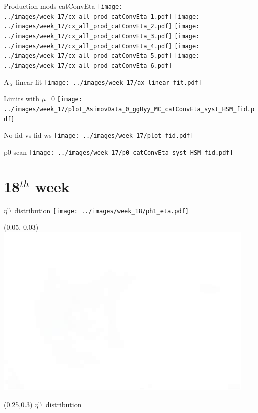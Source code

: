 \documentclass[10pt,UKenglish, leqno, xcolor = dvipsnames]{beamer}
\begin{document}
		\begin{frame}{Production mods catConvEta}
			\vfill
			\centering
			\texttt{[image: ../images/week\_17/cx\_all\_prod\_catConvEta\_1.pdf]}
			\texttt{[image: ../images/week\_17/cx\_all\_prod\_catConvEta\_2.pdf]}
			\texttt{[image: ../images/week\_17/cx\_all\_prod\_catConvEta\_3.pdf]}
			\texttt{[image: ../images/week\_17/cx\_all\_prod\_catConvEta\_4.pdf]}
			\texttt{[image: ../images/week\_17/cx\_all\_prod\_catConvEta\_5.pdf]}
			\texttt{[image: ../images/week\_17/cx\_all\_prod\_catConvEta\_6.pdf]}
			\vfill
		\end{frame}
	
		\begin{frame}{A$_X$ linear fit}
			\vfill
			\centering
			\texttt{[image: ../images/week\_17/ax\_linear\_fit.pdf]}
			\vfill
		\end{frame}
	
		\begin{frame}{Limits with $\mu$=0}
			\vfill
			\centering
			\texttt{[image: ../images/week\_17/plot\_AsimovData\_0\_ggHyy\_MC\_catConvEta\_syst\_HSM\_fid.pdf]}
			\vfill
		\end{frame}
	
	
		\begin{frame}{No fid vs fid ws}
			\vfill
			\centering
			\texttt{[image: ../images/week\_17/plot\_fid.pdf]}
			\vfill
		\end{frame}
	
		\begin{frame}{p0 scan}
			\vfill
			\centering
			\texttt{[image: ../images/week\_17/p0\_catConvEta\_syst\_HSM\_fid.pdf]}
			\vfill
		\end{frame}
	
	\section{18$^{th}$ week}
	\SectionPage
	
		\begin{frame}{$\eta^{\gamma_1}$ distribution}
			\vfill
			\centering
			\texttt{[image: ../images/week\_18/ph1\_eta.pdf]}
			\vfill
			\begin{textblock}{}(0.05,-0.03)
				\includegraphics[width=.25\textwidth]{Pres_Images/HGam/white.jpeg}
			\end{textblock}
			\begin{textblock}{}(0.25,0.3)
				$\eta^{\gamma_1}$ distribution
			\end{textblock}
		\end{frame}
	
\end{document}
